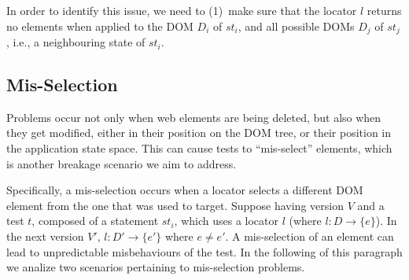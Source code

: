 In order to identify this issue, we need to (1)~make sure that the locator $l$ returns no elements when applied to the DOM $D_i$ of $st_i$, and all possible DOMs $D_j$ of $st_j$, i.e., a neighbouring state of $st_i$.

\subsection{Mis-Selection}\label{sec:misselection}
Problems occur not only when web elements are being deleted, but also when they get modified, either in their position on the DOM tree, or their position in the application state space. This can cause tests to ``mis-select'' elements, which is another breakage scenario we aim to address.

Specifically, a mis-selection occurs when a locator selects a different DOM element from the one that was used to target. Suppose having version $V$ and a test $t$, composed of a statement $st_i$, which uses a locator $l$ (where $l: D \rightarrow \{e\}$).
In the next version $V'$, $l: D' \rightarrow \{e'\}$ where $e \ne e'$.
A mis-selection of an element can lead to unpredictable misbehaviours of the test. In the following of this paragraph we analize two scenarios pertaining to mis-selection problems. 

